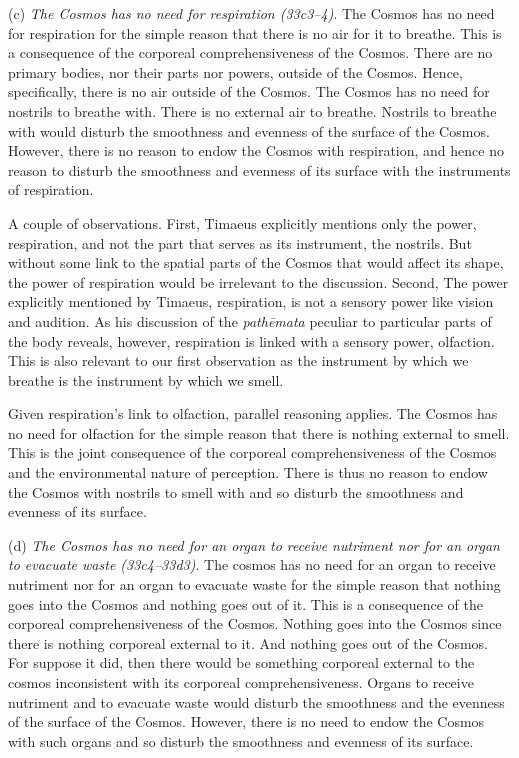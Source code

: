 (c) \emph{The Cosmos has no need for respiration (33c3--4)}. The Cosmos has no need for respiration for the simple reason that there is no air for it to breathe. This is a consequence of the corporeal comprehensiveness of the Cosmos. There are no primary bodies, nor their parts nor powers, outside of the Cosmos. Hence, specifically, there is no air outside of the Cosmos. The Cosmos has no need for nostrils to breathe with. There is no external air to breathe. Nostrils to breathe with would disturb the smoothness and evenness of the surface of the Cosmos. However, there is no reason to endow the Cosmos with respiration, and hence no reason to disturb the smoothness and evenness of its surface with the instruments of respiration.

A couple of observations. First, Timaeus explicitly mentions only the power, respiration, and not the part that serves as its instrument, the nostrils. But without some link to the spatial parts of the Cosmos that would affect its shape, the power of respiration would be irrelevant to the discussion. Second, The power explicitly mentioned by Timaeus, respiration, is not a sensory power like vision and audition. As his discussion of the \emph{pathēmata} peculiar to particular parts of the body reveals, however, respiration is linked with a sensory power, olfaction. This is also relevant to our first observation as the instrument by which we breathe is the instrument by which we smell.

Given respiration's link to olfaction, parallel reasoning applies. The Cosmos has no need for olfaction for the simple reason that there is nothing external to smell. This is the joint consequence of the corporeal comprehensiveness of the Cosmos and the environmental nature of perception. There is thus no reason to endow the Cosmos with nostrils to smell with and so disturb the smoothness and evenness of its surface.

(d) \emph{The Cosmos has no need for an organ to receive nutriment nor for an organ to evacuate waste (33c4--33d3)}. The cosmos has no need for an organ to receive nutriment nor for an organ to evacuate waste for the simple reason that nothing goes into the Cosmos and nothing goes out of it. This is a consequence of the corporeal comprehensiveness of the Cosmos. Nothing goes into the Cosmos since there is nothing corporeal external to it. And nothing goes out of the Cosmos. For suppose it did, then there would be something corporeal external to the cosmos inconsistent with its corporeal comprehensiveness. Organs to receive nutriment and to evacuate waste would disturb the smoothness and the evenness of the surface of the Cosmos. However, there is no need to endow the Cosmos with such organs and so disturb the smoothness and evenness of its surface.

